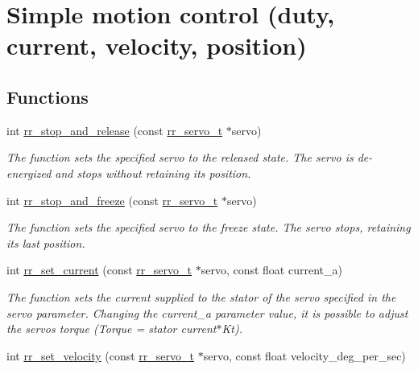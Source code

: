 \hypertarget{group___motion}{}\section{Simple motion control (duty, current, velocity, position)}
\label{group___motion}
\subsection*{Functions}
\begin{DoxyCompactItemize}
\item 
int \hyperlink{group___motion_ga4bc3f475fd951403fbd99e51dc3aba4a}{rr\+\_\+stop\+\_\+and\+\_\+release} (const \hyperlink{structrr__servo__t}{rr\+\_\+servo\+\_\+t} $\ast$servo)
\begin{DoxyCompactList}\small\item\em The function sets the specified servo to the released state. The servo is de-\/energized and stops without retaining its position. \end{DoxyCompactList}\item 
int \hyperlink{group___motion_gabc7b250aba6f86e29692957eac9ecb31}{rr\+\_\+stop\+\_\+and\+\_\+freeze} (const \hyperlink{structrr__servo__t}{rr\+\_\+servo\+\_\+t} $\ast$servo)
\begin{DoxyCompactList}\small\item\em The function sets the specified servo to the freeze state. The servo stops, retaining its last position. \end{DoxyCompactList}\item 
int \hyperlink{group___motion_gac25d20b331b1b985c1f6f50106d5c971}{rr\+\_\+set\+\_\+current} (const \hyperlink{structrr__servo__t}{rr\+\_\+servo\+\_\+t} $\ast$servo, const float current\+\_\+a)
\begin{DoxyCompactList}\small\item\em The function sets the current supplied to the stator of the servo specified in the \textquotesingle{}servo\textquotesingle{} parameter. Changing the \textquotesingle{}current\+\_\+a parameter\textquotesingle{} value, it is possible to adjust the servo\textquotesingle{}s torque (Torque = stator current$\ast$\+Kt). \end{DoxyCompactList}\item 
int \hyperlink{group___motion_gaf790a253c11e2bc0bfb208dd26e7491c}{rr\+\_\+set\+\_\+velocity} (const \hyperlink{structrr__servo__t}{rr\+\_\+servo\+\_\+t} $\ast$servo, const float velocity\+\_\+deg\+\_\+per\+\_\+sec)

\end{DoxyCompactItemize}
